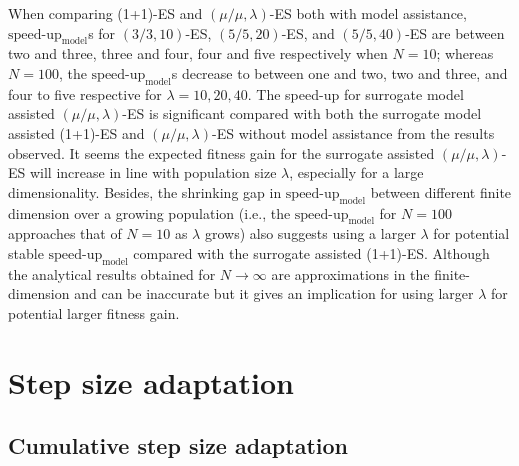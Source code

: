 When comparing (1+1)-ES and $(\mu/\mu,\lambda)$-ES both with model assistance, $\text{speed-up}_{\text{model}}$s for $(3/3,10)$-ES, $(5/5,20)$-ES, and $(5/5,40)$-ES are between two and three, three and four, four and five respectively when $N=10$; whereas $N=100$, the $\text{speed-up}_{\text{model}}$s decrease to between one and two, two and three, and four to five respective for $\lambda=10,20,40$. The speed-up for surrogate model assisted $(\mu/\mu,\lambda)$-ES is significant compared with both the surrogate model assisted (1+1)-ES and $(\mu/\mu,\lambda)$-ES without model assistance from the results observed. It seems the expected fitness gain for the surrogate assisted $(\mu/\mu,\lambda)$-ES will increase in line with population size $\lambda$, especially for a large dimensionality. Besides, the shrinking gap in $\text{speed-up}_{\text{model}}$ between different finite dimension over a growing population (i.e., the $\text{speed-up}_{\text{model}}$ for $N=100$ approaches that of $N=10$ as $\lambda$ grows) also suggests using a larger $\lambda$ for potential stable $\text{speed-up}_{\text{model}}$ compared with the surrogate assisted (1+1)-ES. Although the analytical results obtained for $N\rightarrow \infty$ are approximations in the finite-dimension and can be inaccurate but it gives an implication for using larger $\lambda$ for potential larger fitness gain.










\section{Step size adaptation}\label{sec:step_size_adaptation}

\subsection{Cumulative step size adaptation}

